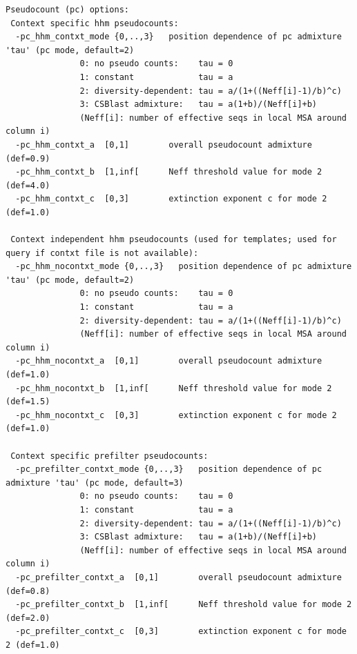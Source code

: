 \documentclass[11pt,a4paper]{article}
\begin{document}
\begin{verbatim}
Pseudocount (pc) options:                                                        
 Context specific hhm pseudocounts:
  -pc_hhm_contxt_mode {0,..,3}   position dependence of pc admixture 'tau' (pc mode, default=2) 
               0: no pseudo counts:    tau = 0                                  
               1: constant             tau = a                                  
               2: diversity-dependent: tau = a/(1+((Neff[i]-1)/b)^c)            
               3: CSBlast admixture:   tau = a(1+b)/(Neff[i]+b)                 
               (Neff[i]: number of effective seqs in local MSA around column i) 
  -pc_hhm_contxt_a  [0,1]        overall pseudocount admixture (def=0.9)                        
  -pc_hhm_contxt_b  [1,inf[      Neff threshold value for mode 2 (def=4.0)                      
  -pc_hhm_contxt_c  [0,3]        extinction exponent c for mode 2 (def=1.0)                     

 Context independent hhm pseudocounts (used for templates; used for query if contxt file is not available):
  -pc_hhm_nocontxt_mode {0,..,3}   position dependence of pc admixture 'tau' (pc mode, default=2) 
               0: no pseudo counts:    tau = 0                                  
               1: constant             tau = a                                  
               2: diversity-dependent: tau = a/(1+((Neff[i]-1)/b)^c)            
               (Neff[i]: number of effective seqs in local MSA around column i) 
  -pc_hhm_nocontxt_a  [0,1]        overall pseudocount admixture (def=1.0)                        
  -pc_hhm_nocontxt_b  [1,inf[      Neff threshold value for mode 2 (def=1.5)                      
  -pc_hhm_nocontxt_c  [0,3]        extinction exponent c for mode 2 (def=1.0)                     

 Context specific prefilter pseudocounts:
  -pc_prefilter_contxt_mode {0,..,3}   position dependence of pc admixture 'tau' (pc mode, default=3) 
               0: no pseudo counts:    tau = 0                                  
               1: constant             tau = a                                  
               2: diversity-dependent: tau = a/(1+((Neff[i]-1)/b)^c)            
               3: CSBlast admixture:   tau = a(1+b)/(Neff[i]+b)                 
               (Neff[i]: number of effective seqs in local MSA around column i) 
  -pc_prefilter_contxt_a  [0,1]        overall pseudocount admixture (def=0.8)                        
  -pc_prefilter_contxt_b  [1,inf[      Neff threshold value for mode 2 (def=2.0)                      
  -pc_prefilter_contxt_c  [0,3]        extinction exponent c for mode 2 (def=1.0)                     


\end{verbatim}
\end{document}
